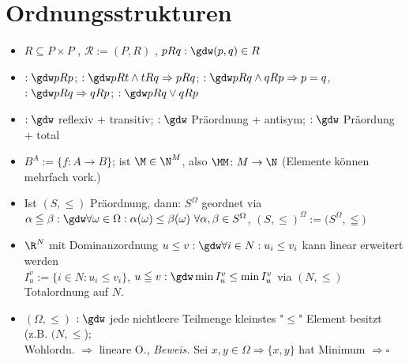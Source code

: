 
\newcommand{\directoryPrefix}{../latex/} %



	\section{Ordnungsstrukturen}
	\begin{itemize}
		\item $R\subseteq P\times P$ , $\mathscr{R}:=(P,R)$ , $pRq:\gdw (p,q)\in R$
		\item {} $:\gdw pRp$;  $:\gdw pRt\wedge tRq\Rightarrow pRq$;  $:\gdw pRq\wedge qRp\Rightarrow p=q$,  $:\gdw pRq\Rightarrow qRp$;  $:\gdw pRq\vee qRp$
		\item {} $:\gdw$ reflexiv + transitiv;  $:\gdw$ Präordnung + antisym;  $:\gdw$ Präordung + total
		\item $B^A:=\lbrace f\colon A\to B\rbrace$;   ist $\M\in\N^M$, also $\MM\colon M\to\N$ (Elemente können mehrfach vork.)
		\item Ist $(S,\leq)$ Präordnung, dann: $S^\Omega$ geordnet via \\
		$
		\alpha\leqq\beta:\gdw\forall\omega\in\Omega:\alpha(\omega)\leq\beta(\omega)~\forall\alpha,\beta\in S^\Omega
		$, $(S,\leq)^\Omega:=\big(S^\Omega,\leqq\big)$
		\item $\R^N$ mit Dominanzordnung $u\leq v:\gdw\forall i\in N:u_i\leq v_i$ kann linear erweitert werden\\
		$I_u^v:=\lbrace i\in N: u_i\leq v_i\rbrace$, $u\leqq v:\gdw\min I_u^v\leq\min I_u^v$ via $(N,\leq)$ Totalordnung auf $N$.
		\item $(\Omega,\leq)$  $:\gdw$ jede nichtleere Teilmenge kleinstes "$\leq$" Element besitzt (z.B. $(N,\leq$);\\
		Wohlordn. $\Rightarrow$ lineare O., \textit{Beweis.}  Sei $x,y\in\Omega\Rightarrow\lbrace x,y\rbrace$ hat Minimum $\Rightarrow\square$

\end{itemize}
